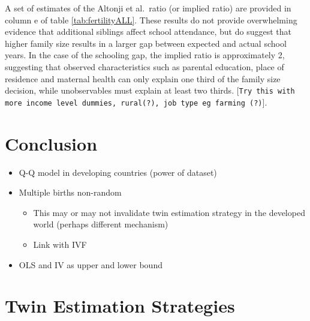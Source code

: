 \documentclass{article}[11pt,subeqn]
\begin{document}
\begin{spacing}{1.25}
A set of estimates of the Altonji et al.\ ratio (or implied ratio) are provided in column e of table \ref{tab:fertilityALL}.  These results do not provide overwhelming evidence
that additional siblings affect school attendance, but do suggest that higher family size results in a larger gap between expected and actual school years.  In the case
of the schooling gap, the implied ratio is approximately 2, suggesting that observed characteristics such as parental education, place of residence and maternal health can only
explain one third of the family size decision, while unobservables must explain at least two thirds. [\texttt{Try this with more income level dummies, rural(?), job type eg farming 
(?)}].

\section{Conclusion}
\label{scn:conclusion}
\begin{itemize}
 \item Q-Q model in developing countries (power of dataset)
 \item Multiple births non-random
 \begin{itemize}
  \item This may or may not invalidate twin estimation strategy in the developed world (perhaps different mechanism)
  \item Link with IVF 
 \end{itemize}
 \item OLS and IV as upper and lower bound
\end{itemize}



\newpage


\newpage
\appendix
\section{Twin Estimation Strategies}
\label{scn:litrev}

\vspace{19.2cm}	


\end{spacing}
\end{document}
